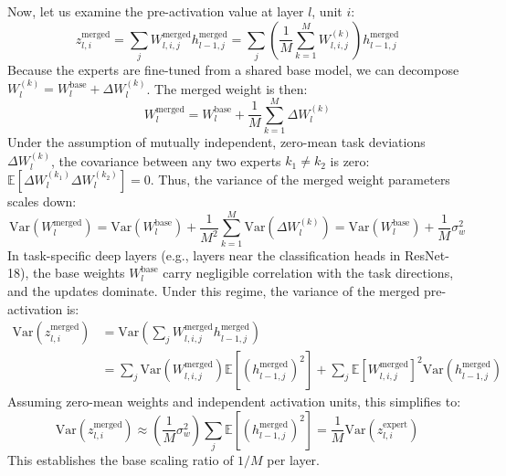 \documentclass{article}
\theoremstyle{plain}
\theoremstyle{definition}
\theoremstyle{remark}
\begin{document}
Now, let us examine the pre-activation value at layer $l$, unit $i$:
\begin{equation}
z_{l, i}^{\text{merged}} = \sum_j W_{l, i, j}^{\text{merged}} h_{l-1, j}^{\text{merged}} = \sum_j \left( \frac{1}{M} \sum_{k=1}^M W_{l, i, j}^{(k)} \right) h_{l-1, j}^{\text{merged}}
\end{equation}
Because the experts are fine-tuned from a shared base model, we can decompose $W_l^{(k)} = W_l^{\text{base}} + \Delta W_l^{(k)}$. The merged weight is then:
\begin{equation}
W_l^{\text{merged}} = W_l^{\text{base}} + \frac{1}{M}\sum_{k=1}^M \Delta W_l^{(k)}
\end{equation}
Under the assumption of mutually independent, zero-mean task deviations $\Delta W_l^{(k)}$, the covariance between any two experts $k_1 \neq k_2$ is zero: $\mathbb{E}[\Delta W_l^{(k_1)} \Delta W_l^{(k_2)}] = 0$. Thus, the variance of the merged weight parameters scales down:
\begin{equation}
\text{Var}(W_l^{\text{merged}}) = \text{Var}(W_l^{\text{base}}) + \frac{1}{M^2} \sum_{k=1}^M \text{Var}(\Delta W_l^{(k)}) = \text{Var}(W_l^{\text{base}}) + \frac{1}{M} \sigma^2_w
\end{equation}
In task-specific deep layers (e.g., layers near the classification heads in ResNet-18), the base weights $W_l^{\text{base}}$ carry negligible correlation with the task directions, and the updates dominate. Under this regime, the variance of the merged pre-activation is:
\begin{align}
\text{Var}(z_{l, i}^{\text{merged}}) &= \text{Var}\left( \sum_j W_{l, i, j}^{\text{merged}} h_{l-1, j}^{\text{merged}} \right) \\
&= \sum_j \text{Var}(W_{l, i, j}^{\text{merged}}) \mathbb{E}[(h_{l-1, j}^{\text{merged}})^2] + \sum_j \mathbb{E}[W_{l, i, j}^{\text{merged}}]^2 \text{Var}(h_{l-1, j}^{\text{merged}})
\end{align}
Assuming zero-mean weights and independent activation units, this simplifies to:
\begin{equation}
\text{Var}(z_{l, i}^{\text{merged}}) \approx \left( \frac{1}{M} \sigma^2_w \right) \sum_j \mathbb{E}[(h_{l-1, j}^{\text{merged}})^2] = \frac{1}{M} \text{Var}(z_{l, i}^{\text{expert}})
\end{equation}
This establishes the base scaling ratio of $1/M$ per layer.
\end{document}
